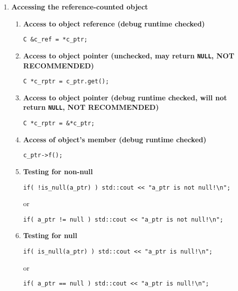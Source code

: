 \documentclass[pdf,ps2pdf,11pt]{SANDreport}
\begin{document}
\begin{enumerate}
\item {\bf Accessing the reference-counted object}
%
\begin{enumerate}
%
\item {\bf Access to object reference (debug runtime checked)}
%
{\small\begin{verbatim}
C &c_ref = *c_ptr;
\end{verbatim}}
%
\item {\bf Access to object pointer (unchecked, may return \texttt{NULL}, NOT RECOMMENDED)}
%
{\small\begin{verbatim}
C *c_rptr = c_ptr.get();
\end{verbatim}}
%
\item {\bf Access to object pointer (debug runtime checked, will not return \texttt{NULL}, NOT RECOMMENDED)}
%
{\small\begin{verbatim}
C *c_rptr = &*c_ptr;
\end{verbatim}}
%
\item {\bf Access of object's member (debug runtime checked)}
%
{\small\begin{verbatim}
c_ptr->f();
\end{verbatim}}
%
\item {\bf Testing for non-null}
%
{\small\begin{verbatim}
if( !is_null(a_ptr) ) std::cout << "a_ptr is not null!\n";
\end{verbatim}}
%
or
%
{\small\begin{verbatim}
if( a_ptr != null ) std::cout << "a_ptr is not null!\n";
\end{verbatim}}
%
\item {\bf Testing for null}
%
{\small\begin{verbatim}
if( is_null(a_ptr) ) std::cout << "a_ptr is null!\n";
\end{verbatim}}
%
or
%
{\small\begin{verbatim}
if( a_ptr == null ) std::cout << "a_ptr is null!\n";
\end{verbatim}}

%
\end{enumerate}


\end{enumerate}
\end{document}
